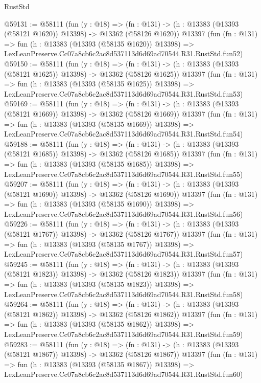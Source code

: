 \begin{lexlean}{RustStd}
\begin{coremodule}
@59131 := @58111
    (fun (y : @18) =>
    (fn : @131) -> (h : @13383 (@13393 (@58121 @1620)) @13398) -> @13362 (@58126 @1620))
    @13397
    (fun (fn : @131) =>
    fun (h : @13383 (@13393 (@58135 @1620)) @13398) =>
    LexLeanPreserve.Cc07a8cb6c2ac8d537113d6d69ad70544.R31.RustStd.fun52)
@59150 := @58111
    (fun (y : @18) =>
    (fn : @131) -> (h : @13383 (@13393 (@58121 @1625)) @13398) -> @13362 (@58126 @1625))
    @13397
    (fun (fn : @131) =>
    fun (h : @13383 (@13393 (@58135 @1625)) @13398) =>
    LexLeanPreserve.Cc07a8cb6c2ac8d537113d6d69ad70544.R31.RustStd.fun53)
@59169 := @58111
    (fun (y : @18) =>
    (fn : @131) -> (h : @13383 (@13393 (@58121 @1669)) @13398) -> @13362 (@58126 @1669))
    @13397
    (fun (fn : @131) =>
    fun (h : @13383 (@13393 (@58135 @1669)) @13398) =>
    LexLeanPreserve.Cc07a8cb6c2ac8d537113d6d69ad70544.R31.RustStd.fun54)
@59188 := @58111
    (fun (y : @18) =>
    (fn : @131) -> (h : @13383 (@13393 (@58121 @1685)) @13398) -> @13362 (@58126 @1685))
    @13397
    (fun (fn : @131) =>
    fun (h : @13383 (@13393 (@58135 @1685)) @13398) =>
    LexLeanPreserve.Cc07a8cb6c2ac8d537113d6d69ad70544.R31.RustStd.fun55)
@59207 := @58111
    (fun (y : @18) =>
    (fn : @131) -> (h : @13383 (@13393 (@58121 @1690)) @13398) -> @13362 (@58126 @1690))
    @13397
    (fun (fn : @131) =>
    fun (h : @13383 (@13393 (@58135 @1690)) @13398) =>
    LexLeanPreserve.Cc07a8cb6c2ac8d537113d6d69ad70544.R31.RustStd.fun56)
@59226 := @58111
    (fun (y : @18) =>
    (fn : @131) -> (h : @13383 (@13393 (@58121 @1767)) @13398) -> @13362 (@58126 @1767))
    @13397
    (fun (fn : @131) =>
    fun (h : @13383 (@13393 (@58135 @1767)) @13398) =>
    LexLeanPreserve.Cc07a8cb6c2ac8d537113d6d69ad70544.R31.RustStd.fun57)
@59245 := @58111
    (fun (y : @18) =>
    (fn : @131) -> (h : @13383 (@13393 (@58121 @1823)) @13398) -> @13362 (@58126 @1823))
    @13397
    (fun (fn : @131) =>
    fun (h : @13383 (@13393 (@58135 @1823)) @13398) =>
    LexLeanPreserve.Cc07a8cb6c2ac8d537113d6d69ad70544.R31.RustStd.fun58)
@59264 := @58111
    (fun (y : @18) =>
    (fn : @131) -> (h : @13383 (@13393 (@58121 @1862)) @13398) -> @13362 (@58126 @1862))
    @13397
    (fun (fn : @131) =>
    fun (h : @13383 (@13393 (@58135 @1862)) @13398) =>
    LexLeanPreserve.Cc07a8cb6c2ac8d537113d6d69ad70544.R31.RustStd.fun59)
@59283 := @58111
    (fun (y : @18) =>
    (fn : @131) -> (h : @13383 (@13393 (@58121 @1867)) @13398) -> @13362 (@58126 @1867))
    @13397
    (fun (fn : @131) =>
    fun (h : @13383 (@13393 (@58135 @1867)) @13398) =>
    LexLeanPreserve.Cc07a8cb6c2ac8d537113d6d69ad70544.R31.RustStd.fun60)

\end{coremodule}
\end{lexlean}
